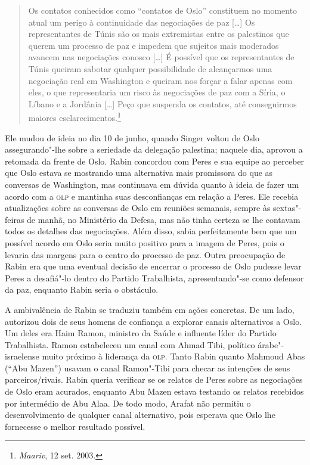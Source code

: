 \begin{quote}
Os contatos conhecidos como ``contatos de Oslo'' constituem no momento
atual um perigo à continuidade das negociações de paz {[}\ldots{}{]} Os
representantes de Túnis são os mais extremistas entre os palestinos que
querem um processo de paz e impedem que sujeitos mais moderados avancem
nas negociações conosco {[}\ldots{}{]} É possível que os representantes de Túnis
queiram sabotar qualquer possibilidade de alcançarmos uma negociação
real em Washington e queiram nos forçar a falar apenas com eles, o que
representaria um risco às negociações de paz com a Síria, o Líbano e a
Jordânia {[}\ldots{}{]} Peço que suspenda os contatos, até conseguirmos maiores
esclarecimentos.\footnote{\textit{Maariv}, 12 set. 2003.}
\end{quote}

Ele mudou de ideia no dia 10 de junho, quando Singer voltou de Oslo
assegurando"-lhe sobre a seriedade da delegação palestina; naquele dia,
aprovou a retomada da frente de Oslo. Rabin concordou com Peres e sua
equipe ao perceber que Oslo estava se mostrando uma alternativa mais
promissora do que as conversas de Washington, mas continuava em dúvida
quanto à ideia de fazer um acordo com a \textsc{olp} e mantinha suas
desconfianças em relação a Peres. Ele recebia atualizações sobre as
conversas de Oslo em reuniões semanais, sempre às sextas"-feiras de
manhã, no Ministério da Defesa, mas não tinha certeza se lhe contavam
todos os detalhes das negociações. Além disso, sabia perfeitamente bem
que um possível acordo em Oslo seria muito positivo para a imagem de
Peres, pois o levaria das margens para o centro do processo de paz.
Outra preocupação de Rabin era que uma eventual decisão de encerrar o
processo de Oslo pudesse levar Peres a desafiá"-lo dentro do Partido
Trabalhista, apresentando"-se como defensor da paz, enquanto Rabin seria
o obstáculo.

A ambivalência de Rabin se traduziu também em ações concretas. De um
lado, autorizou dois de seus homens de confiança a explorar canais
alternativos a Oslo. Um deles era Haim Ramon, ministro da Saúde e
influente líder do Partido Trabalhista. Ramon estabeleceu um canal com
Ahmad Tibi, político árabe"-israelense muito próximo à liderança da \textsc{olp}.
Tanto Rabin quanto Mahmoud Abas (``Abu Mazen'') usavam o canal Ramon"-Tibi
para checar as intenções de seus parceiros/rivais. Rabin queria
verificar se os relatos de Peres sobre as negociações de Oslo eram
acurados, enquanto Abu Mazen estava testando os relatos recebidos por
intermédio de Abu Alaa. De todo modo, Arafat não permitiu o
desenvolvimento de qualquer canal alternativo, pois esperava que Oslo
lhe fornecesse o melhor resultado possível.

